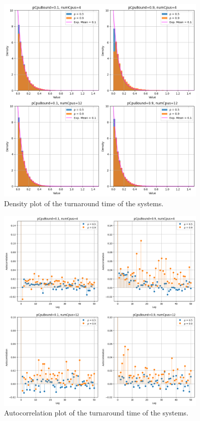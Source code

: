 \begin{figure}[H]
    \captionsetup{type=figure}
    \centering
    \includegraphics[width=0.9\textwidth]{./images/04/sjf/turn/density.png}
    \caption{Density plot of the turnaround time of the systems.}
    \label{fig:sjfTurnDensity}
\end{figure}

\begin{figure}[H]
    \captionsetup{type=figure}
    \centering
    \includegraphics[width=0.9\textwidth]{./images/04/sjf/turn/autocorrelation.png}
    \caption{Autocorrelation plot of the turnaround time of the systems.}
    \label{fig:sjfTurnAutocorrelation}
\end{figure}

